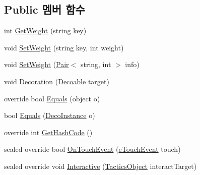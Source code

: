\subsection*{Public 멤버 함수}
\begin{DoxyCompactItemize}
\item 
int \hyperlink{class_m_c_n_1_1_decorator_a2fa8df5e51cc3fdaa63b28c4e4917670}{Get\+Weight} (string key)
\item 
void \hyperlink{class_m_c_n_1_1_decorator_a0658f2776c28dad0517b56085910162c}{Set\+Weight} (string key, int weight)
\item 
void \hyperlink{class_m_c_n_1_1_decorator_aa64c6b8a8f30f4e8083da6dd0fab226c}{Set\+Weight} (\hyperlink{class_m_c_n_1_1_pair}{Pair}$<$ string, int $>$ info)
\item 
void \hyperlink{class_m_c_n_1_1_decorator_ab82c83f62182a25a72dc81530c743c32}{Decoration} (\hyperlink{class_m_c_n_1_1_decoable}{Decoable} target)
\item 
override bool \hyperlink{class_m_c_n_1_1_decorator_ae2a5432ce00298c80dcb433a75bbe45d}{Equals} (object o)
\item 
bool \hyperlink{class_m_c_n_1_1_decorator_a3ad7a8cf76c976907116f85a65a9f8e9}{Equals} (\hyperlink{class_m_c_n_1_1_deco_instance}{Deco\+Instance} o)
\item 
override int \hyperlink{class_m_c_n_1_1_decorator_a6df84cd2af5b096128e84791455c083f}{Get\+Hash\+Code} ()
\item 
sealed override bool \hyperlink{class_m_c_n_1_1_decorator_ac45ab12c190bd9f5188c9f748f8ddbbf}{On\+Touch\+Event} (\hyperlink{_touch_manager_8cs_ae33e321a424fe84ba8b2fdb81ad40a68}{e\+Touch\+Event} touch)
\item 
sealed override void \hyperlink{class_m_c_n_1_1_decorator_ae58cb79cf1ee47006b7dbdac82b97dc5}{Interactive} (\hyperlink{class_tactics_object}{Tactics\+Object} interact\+Target)
\end{DoxyCompactItemize}
